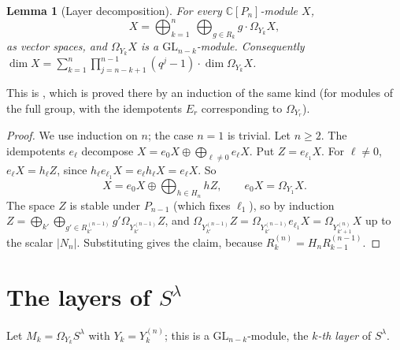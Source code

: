 \documentclass[11pt, letterpaper]{amsart}
\newtheorem{lemma}{Lemma}
\theoremstyle{definition}
\theoremstyle{remark}
\newcommand{\CC}{\mathbb{C}}
\newcommand{\GL}{\mathrm{GL}}
\begin{document}
\begin{lemma}[Layer decomposition]\label{lemlayers}
For every $\CC[P_n]$-module $X$,
\[
X=\bigoplus_{k=1}^n\ \bigoplus_{g\in R_k}g\cdot \Omega_{Y_k}X ,
\]
as vector spaces, and $\Omega_{Y_k}X$ is a $\GL_{n-k}$-module. Consequently $\dim X=\sum_{k=1}^n\prod_{j=n-k+1}^{n-1}(q^j-1)\cdot\dim \Omega_{Y_k}X$.
\end{lemma}
This is \cite[Thm.~9.11]{James84}, which is proved there by an induction of the same kind (for modules of the full group, with the idempotents $E_r$ corresponding to $\Omega_{Y_r}$).
\begin{proof}
We use induction on $n$; the case $n=1$ is trivial. Let $n\ge2$. The idempotents $e_\ell$ decompose $X=e_0X\oplus\bigoplus_{\ell\ne0}e_\ell X$. Put $Z=e_{\ell_1}X$. For $\ell\neq0$, $e_\ell X=h_\ell Z$, since $h_\ell e_{\ell_1}X=e_\ell h_\ell X=e_\ell X$. So
\[
X=e_0X\oplus\bigoplus_{h\in H_n}hZ,\qquad e_0X=\Omega_{Y_1}X.
\]
The space $Z$ is stable under $P_{n-1}$ (which fixes $\ell_1$), so by induction $Z=\bigoplus_{k'}\bigoplus_{g'\in R^{(n-1)}_{k'}}g'\Omega_{Y^{(n-1)}_{k'}}Z$, and $\Omega_{Y^{(n-1)}_{k'}}Z=\Omega_{Y^{(n-1)}_{k'}}e_{\ell_1}X=\Omega_{Y^{(n)}_{k'+1}}X$ up to the scalar $|N_n|$. Substituting gives the claim, because $R_k^{(n)}=H_nR_{k-1}^{(n-1)}$.
\end{proof}

\section{The layers of \texorpdfstring{$S^\lambda$}{S(lambda)}}\label{seclayersS}

Let $M_k=\Omega_{Y_k}S^\lambda$ with $Y_k=Y^{(n)}_k$; this is a $\GL_{n-k}$-module, the \emph{$k$-th layer} of $S^\lambda$.
\end{document}
